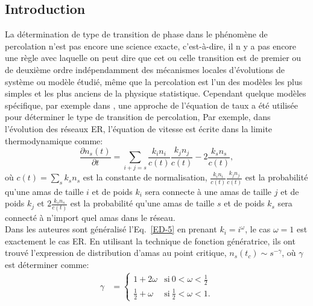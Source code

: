 \subsection{Introduction}
La détermination de type de transition de phase dans le phénomène de percolation n'est pas encore une science exacte, c'est-à-dire, il n y a pas encore une règle avec laquelle on peut dire que cet ou celle transition est de premier ou de deuxième ordre indépendamment des mécanismes locales d'évolutions de système ou modèle étudié, même que la percolation est l'un des modèles les plus simples et les plus anciens de la physique statistique. Cependant quelque modèles spécifique, par exemple dans \cite{Ziff-al1983}, une approche de l'équation de taux a été utilisée pour déterminer le type de transition de percolation, Par exemple, dans l'évolution des réseaux ER, l'équation de vitesse est écrite dans la limite thermodynamique comme:
\begin{equation}
\frac{\partial n_s(t)}{\partial t}=\sum_{i+j=s}\frac{k_in_i}{c(t)}\frac{k_jn_j}{c(t)}-2\frac{k_sn_s}{c(t)},
\label{ED-5}
\end{equation}
où $c(t)=\sum_{s}k_sn_s$ est la constante de normalisation, $\frac{k_in_i}{c(t)}\frac{k_jn_j}{c(t)}$ est la probabilité qu'une amas de taille $i$ et de poids $k_i$ sera connecte à une amas de taille $j$ et de poids $k_j$ et $2\frac{k_sn_s}{c(t)}$ est la probabilité qu'une amas de taille $s$ et de poids $k_s$ sera connecté à n'import quel amas dans le réseau.\\
Dans \cite{Cho-al2010,Cho2-Kahng2011} les auteures sont généralisé l'Eq.~\ref{ED-5} en prenant $k_i=i^{\omega}$, le cas $\omega=1$ est exactement le cas ER. En utilisant la technique de fonction génératrice, ils ont trouvé l'expression de distribution d'amas au point critique, $n_s(t_c)\sim s^{-\gamma}$, où $\gamma$ est déterminer comme:
\begin{align}
\gamma &=
\begin{cases}
1+2\omega & \text{si}\ 0<\omega<\frac{1}{2} \\
 \frac{1}{2}+\omega& \text{si}\ \frac{1}{2}<\omega<1.
\end{cases}
\label{gama}
\end{align}

